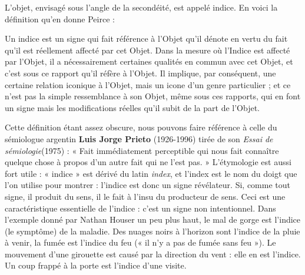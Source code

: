 L’objet, envisagé sous l’angle de la secondéité, est appelé indice. En voici la définition qu’en donne Peirce :
\begin{lecture}{}
Un indice est un signe qui fait référence à l’Objet qu’il dénote en vertu du fait qu’il est réellement affecté par cet Objet. Dans la mesure où l’Indice est affecté par l’Objet, il a nécessairement certaines qualités en commun avec cet Objet, et c’est sous ce rapport qu’il réfère à l’Objet. Il implique, par conséquent, une certaine relation iconique à l’Objet, mais un icone d’un genre particulier ; et ce n’est pas la simple ressemblance à son Objet, même sous ces rapports, qui en font un signe mais les modifications réelles qu’il subit de la part de l’Objet.
\end{lecture}
Cette définition étant assez obscure, nous pouvons faire référence à celle du sémiologue argentin \textbf{Luis Jorge Prieto} (1926-1996) tirée de son \textit{Essai de sémiologie}(1975) : « Fait immédiatement perceptible qui nous fait connaître quelque chose à propos d’un autre fait qui ne l’est pas. » L’étymologie est aussi fort utile : « indice » est dérivé du latin \textit{index}, et l’index est le nom du doigt que l’on utilise pour montrer : l’indice est donc un signe révélateur. Si, comme tout signe, il produit du sens, il le fait à l’insu du producteur de sens. Ceci est une caractéristique essentielle de l’indice : c’est un signe non intentionnel. Dans l’exemple donné par Nathan Houser un peu plus haut, le mal de gorge est l’indice (le symptôme) de la maladie. Des nuages noirs à l’horizon sont l’indice de la pluie à venir, la fumée est l’indice du feu (« il n’y a pas de fumée sans feu »). Le mouvement d’une girouette est causé par la direction du vent : elle en est l’indice. Un coup frappé à la porte est l’indice d’une visite.

